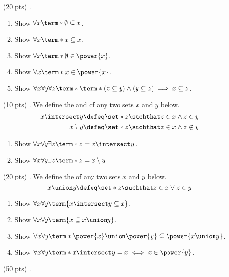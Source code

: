 \begin{enumerate}
  \item[(20 pts) \quad 1.]
    \begin{enumerate}
      \item
        Show $\forall x \term*{\emptyset \subseteq x}$.
      \item
        Show $\forall x \term*{x \subseteq x}$.
      \item
        Show $\forall x \term*{\emptyset \in \power{x}}$.
      \item
        Show $\forall x \term*{x \in \power{x}}$.
      \item
        Show $\forall x \forall y \forall z \term*{\term*{(x \subseteq y) \land (y \subseteq z)} \implies x \subseteq z}$.
    \end{enumerate}
  \item[(10 pts) \quad 2.]
    We define the  and  of any two sets $x$ and $y$ below.
    \begin{align*}
      x \intersect y &\defeq \set*{z \suchthat z \in x \land z \in y} \\
      x \setminus y &\defeq \set*{z \suchthat z \in x \land z \not \in y}
    \end{align*}
    \begin{enumerate}
      \item
        Show $\forall x \forall y \exists z \term*{z = x \intersect y}$.
      \item
        Show $\forall x \forall y \exists z \term*{z = x \setminus y}$.
    \end{enumerate}
  \item[(20 pts) \quad 3.]
    We define the  of any two sets $x$ and $y$ below.
    \begin{equation*}
      x \union y \defeq \set*{z \suchthat z \in x \lor z \in y}
    \end{equation*}
    \begin{enumerate}
      \item
        Show $\forall x \forall y \term{x \intersect y \subseteq x}$.
      \item
        Show $\forall x \forall y \term{x \subseteq x \union y}$.
      \item
        Show $\forall x \forall y \term*{\power{x} \union \power{y} \subseteq \power{x \union y}}$.
      \item
        Show $\forall x \forall y \term*{x \intersect y = x \iff x \in \power{y}}$.
    \end{enumerate}
  \item[(50 pts) \quad 4.]

\end{enumerate}
